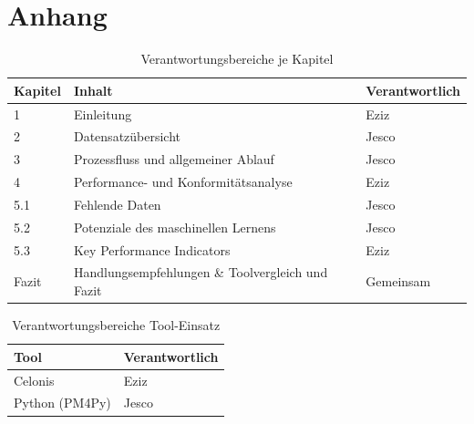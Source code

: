 \appendix
{}
{}
\section*{Anhang}
\label{sec:anhang}
\begin{table}[htbp]
    \centering
    \caption{Verantwortungsbereiche je Kapitel}
    \label{tab:verantwortungsbereiche}
    \begin{tabularx}{\linewidth}{@{}lXl@{}}
        \toprule
        \textbf{Kapitel} & \textbf{Inhalt} & \textbf{Verantwortlich} \\
        \midrule
        1 & Einleitung & Eziz \\
        2 & Datensatzübersicht & Jesco \\
        3 & Prozessfluss und allgemeiner Ablauf & Jesco \\
        4 & Performance- und Konformitätsanalyse & Eziz \\
        5.1 & Fehlende Daten & Jesco \\
        5.2 & Potenziale des maschinellen Lernens & Jesco \\
        5.3 & Key Performance Indicators & Eziz \\
        Fazit & Handlungsempfehlungen \& Toolvergleich und Fazit & Gemeinsam \\
        \bottomrule
    \end{tabularx}
\end{table}

\begin{table}[htbp]
    \centering
    \caption{Verantwortungsbereiche Tool-Einsatz}\label{tab:verantwortungsbereiche_tool}
    \begin{tabular}{@{}ll@{}}
        \toprule
        \textbf{Tool} & \textbf{Verantwortlich} \\
        \midrule
        Celonis & Eziz \\
        Python (PM4Py) & Jesco \\
        \bottomrule
    \end{tabular}
\end{table}

